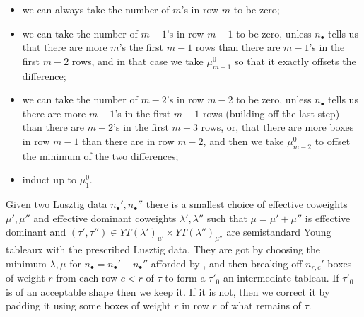 \documentclass[draft]{article}
\begin{document}
\begin{lemma}
    \begin{itemize}
        \item we can always take the number of $m$'s in row $m$ to be zero; 
        \item we can take the number of $m-1$'s in row $m-1$ to be zero, unless $n_\bullet$ tells us that there are more $m$'s the first $m-1$ rows than there are $m-1$'s in the first $m-2$ rows, and in that case we take $\mu^0_{m-1}$ so that it exactly offsets the difference; 
        \item we can take the number of $m-2$'s in row $m-2$ to be zero, unless $n_\bullet$ tells us there are more $m-1$'s in the first $m-1$ rows (building off the last step) than there are $m-2$'s in the first $m-3$ rows, or, that there are more boxes in row $m-1$ than there are in row $m-2$, and then we take $\mu^0_{m-2}$ to offset the minimum of the two differences; 
        \item induct up to $\mu^0_1$. 
    \end{itemize}
\end{lemma}

\begin{proposition}
    \label{prop:minwts}
    Given two Lusztig data $n_\bullet',n_\bullet''$ there is a smallest choice of effective coweights $\mu',\mu''$ and effective dominant coweights $\lambda',\lambda''$ such that $\mu = \mu' + \mu''$ is effective dominant and $(\tau',\tau'')\in YT(\lambda')_{\mu'}\times YT(\lambda'')_{\mu''}$ are semistandard Young tableaux with the prescribed Lusztig data. They are got by choosing the minimum $\lambda,\mu$ for $n_\bullet = n_\bullet ' + n_\bullet ''$ afforded by , and then breaking off $n_{r,c}'$ boxes of weight $r$ from each row $c<r$ of $\tau$ to form a $\tau'_0$ an intermediate tableau. If $\tau'_0$ is of an acceptable shape then we keep it. If it is not, then we correct it by padding it using some boxes of weight $r$ in row $r$ of what remains of $\tau$.

\end{proposition}
\end{document}
